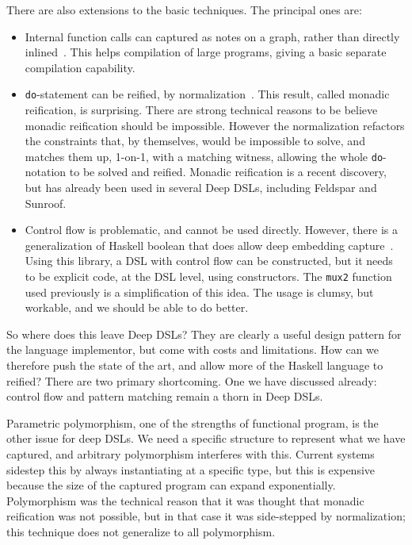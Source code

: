 \documentclass[11pt]{article}
\begin{document}
\noindent
There are also extensions to the basic techniques. The principal ones are:
\begin{itemize}
\item Internal function calls can captured as notes on a graph, 
rather than directly inlined~\cite{Mainland:10:Nikola}. 
This helps compilation of large programs, giving a basic separate compilation capability.
\item \verb|do|-statement can be reified, by normalization~\cite{Sculthorpe:13:ConstrainedMonad,Svenningsson:13:CompositionalMonadReification,Persson:11:GenericMonadicConstructs}. This result, called monadic
reification, is surprising. There are strong technical reasons to be believe monadic reification
should be impossible. However the normalization refactors the constraints that, by themselves, would
be impossible to solve, and matches them up, 1-on-1, with a matching witness, allowing the whole
\verb|do|-notation to be solved and reified.
Monadic reification is a recent discovery, but has already been used in several Deep DSLs,
including Feldspar\cite{Axelsson:2010:DandI-Feldspar} and Sunroof\cite{Bracker:14:Sunroof}.
\item Control flow is problematic, and cannot be used directly. However,
there is a generalization of Haskell boolean that does allow deep embedding capture~\cite{hackage:boolean}.
Using this library, a DSL with control flow can be constructed, but it needs to be explicit
code, at the DSL level, using constructors. 
The \verb|mux2| function used previously is a simplification of this idea.
The usage is clumsy, but workable, and we should be able to do better.
\end{itemize}

So where does this leave Deep DSLs? They are clearly a useful design pattern for the
language implementor, but come with costs and limitations. How can we therefore
push the state of the art, and allow more of the Haskell language to reified?
There are two primary shortcoming.
One we have discussed already: control flow and pattern matching remain a thorn in Deep DSLs. 

Parametric polymorphism, one of the strengths of functional program, is the other
issue for deep DSLs. We need a specific structure to represent what we have captured,
and arbitrary polymorphism interferes with this. Current systems sidestep this
by always instantiating at a specific type, but this is expensive because the size of
the captured program can expand exponentially.
Polymorphism was the technical reason that it was thought that monadic reification
was not possible, but in that case it was side-stepped by normalization; this technique
does not generalize to all polymorphism.
\end{document}
